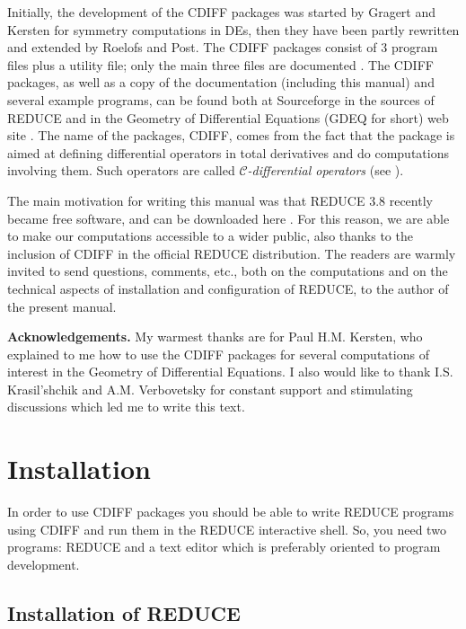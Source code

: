 \documentclass[12pt]{amsart}
\theoremstyle{definition}
\newcommand{\cdiff}{CDIFF\xspace}
\newcommand{\reduce}{REDUCE\xspace}
\begin{document}
Initially, the development of the \cdiff packages was started by Gragert and
Kersten for symmetry computations in DEs, then they have been partly rewritten
and extended by Roelofs and Post. The \cdiff packages consist of 3 program
files plus a utility file; only the main three files are documented
\cite{svec,integ,tools}. The \cdiff packages, as well as a copy of the
documentation (including this manual) and several example programs, can be
found both at Sourceforge in the sources of \reduce \cite{red} and in the
Geometry of Differential Equations (GDEQ for short) web site \cite{gdeq}. The
name of the packages, \cdiff, comes from the fact that the package is aimed at
defining differential operators in total derivatives and do computations
involving them.  Such operators are called \emph{$\mathcal{C}$-differential
  operators} (see \cite{Many}).

The main motivation for writing this manual was that \reduce 3.8 recently became
free software, and can be downloaded here \cite{red}. For this reason, we are
able to make our computations accessible to a wider public, also thanks to the
inclusion of \cdiff in the official \reduce distribution. The readers are
warmly invited to send questions, comments, etc., both on the computations and
on the technical aspects of installation and configuration of \reduce, to the
author of the present manual.

\textbf{Acknowledgements.} My warmest thanks are for Paul H.M. Kersten, who
explained to me how to use the \cdiff packages for several computations of
interest in the Geometry of Differential Equations. I also would like to thank
I.S. Krasil'shchik and A.M. Verbovetsky for constant support and stimulating
discussions which led me to write this text.

\section{Installation}

In order to use \cdiff packages you should be able to write \reduce programs
using \cdiff and run them in the \reduce interactive shell. So, you need two
programs: \reduce and a text editor which is preferably oriented to program
development.

\subsection{Installation of \reduce}
\label{sec:installation-reduce}
\end{document}
